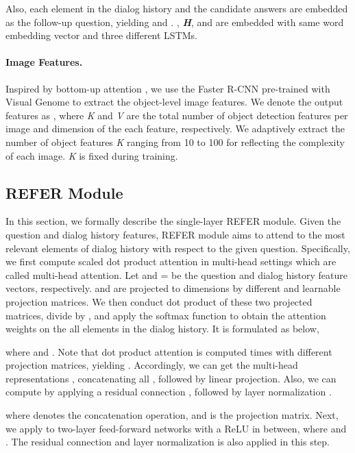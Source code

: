 \documentclass[11pt,a4paper]{article}
\begin{document}
 
Also, each element in the dialog history {\it } and the candidate answers {\it } are embedded as the follow-up question, yielding {\it }    and {\it }  . {\bf{\it }}, {\bf{\it H}}, and {\bf{\it }} are embedded with same word embedding vector and three different LSTMs.

\paragraph{Image Features.} Inspired by bottom-up attention \cite{Anderson2017up-down}, we use the Faster R-CNN \cite{ren2015faster} pre-trained with Visual Genome \cite{krishna2017visual} to extract the object-level image features. We denote the output features as  , where {\it K} and {\it V} are the total number of object detection features per image and dimension of the each feature, respectively. We adaptively extract the number of object features {\it K} ranging from 10 to 100 for reflecting the complexity of each image. {\it K} is fixed during training.

\subsection{REFER Module}
\label{sec:refer}
In this section, we formally describe the single-layer REFER module. Given the question and dialog history features, REFER module aims to attend to the 
most relevant elements of dialog history with respect to the given question. Specifically, we first compute scaled dot product attention \cite{vaswani2017attention} in multi-head settings which are called multi-head attention. Let  and  = {\it } be the question and dialog history feature vectors, respectively.   and  are projected to  dimensions by different and learnable projection matrices. We then conduct dot product of these two projected matrices, divide by , and apply the softmax function to obtain the attention weights on the all elements in the dialog history. It is formulated as below,


where   and  .  Note that dot product attention is computed  times with different projection matrices, yielding {\it }. Accordingly, we can get the multi-head representations , concatenating all {\it }, followed by linear projection. Also, we can compute  by applying a residual connection \cite{he2016deep}, followed by layer normalization \cite{ba2016layer}.


where  denotes the concatenation operation, and   is the projection matrix. Next, we apply  to two-layer feed-forward networks with a ReLU in between, where   and  . The residual connection and layer normalization is also applied in this step.
\end{document}
